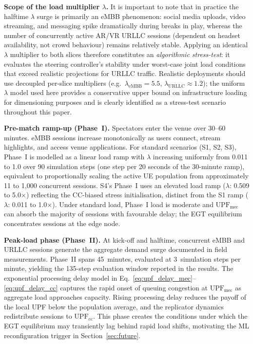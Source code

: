 \documentclass[conference]{IEEEtran}
\begin{document}
\textbf{Scope of the load multiplier $\lambda$.}
It is important to note that in practice the halftime
$\lambda$ surge is primarily an eMBB phenomenon: social
media uploads, video streaming, and messaging spike
dramatically during breaks in play, whereas the number
of concurrently active AR/VR URLLC sessions (dependent
on headset availability, not crowd behaviour) remains
relatively stable. Applying an identical $\lambda$
multiplier to both slices therefore constitutes an
\emph{algorithmic stress-test}: it evaluates the
steering controller's stability under worst-case joint
load conditions that exceed realistic projections for
URLLC traffic. Realistic deployments should use
decoupled per-slice multipliers (e.g.\
$\lambda_\text{eMBB} = 5.5$, $\lambda_\text{URLLC}
\approx 1.2$); the uniform $\lambda$ model used here
provides a conservative upper bound on infrastructure
loading for dimensioning purposes and is clearly
identified as a stress-test scenario throughout this
paper.

\textbf{Pre-match ramp-up (Phase~I).} Spectators enter
the venue over 30--60 minutes. eMBB sessions increase
monotonically as users connect, stream highlights, and
access venue applications. For standard scenarios (S1, S2, S3),
Phase~I is modelled as a linear load ramp with $\lambda$
increasing uniformly from 0.011 to 1.0 over 90 simulation steps
(one step per 20 seconds of the 30-minute ramp), equivalent to
proportionally scaling the active UE population from
approximately 11 to 1,000 concurrent sessions. S4's Phase~I
uses an elevated load ramp ($\lambda$: 0.509 to 5.0$\times$)
reflecting the CC-biased stress initialisation, distinct from
the S1 ramp ($\lambda$: 0.011 to 1.0$\times$). Under standard
load, Phase~I load is moderate and $\text{UPF}_\text{mec}$ can
absorb the majority of sessions with favourable delay; the EGT
equilibrium concentrates sessions at the edge node.

\textbf{Peak-load phase (Phase~II).} At kick-off and
halftime, concurrent eMBB and URLLC sessions generate
the aggregate demand surge documented in field
measurements. Phase~II spans 45~minutes, evaluated at
3~simulation steps per minute, yielding the 135-step
evaluation window reported in the results.
The exponential processing delay model in
Eq.~\eqref{eq:upf_delay_mec}--\eqref{eq:upf_delay_cc}
captures the rapid onset of queuing congestion at
$\text{UPF}_\text{mec}$ as aggregate load approaches
capacity. Rising processing delay reduces the payoff of
the local UPF below the population average, and the
replicator dynamics redistribute sessions to
$\text{UPF}_\text{cc}$. This phase creates the
conditions under which the EGT equilibrium may
transiently lag behind rapid load shifts, motivating
the ML reconfiguration trigger in Section~\ref{sec:future}.
\end{document}
